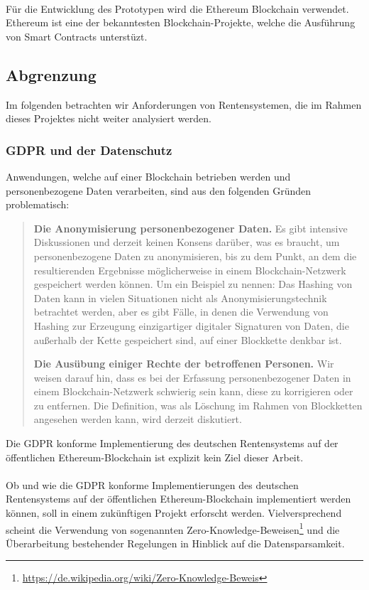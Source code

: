 \paragraph*{}
Für die Entwicklung des Prototypen wird die Ethereum Blockchain verwendet. Ethereum ist eine der bekanntesten Blockchain-Projekte, welche die Ausführung von Smart Contracts unterstüzt.

\subsection{Abgrenzung}
Im folgenden betrachten wir Anforderungen von Rentensystemen, die im Rahmen dieses Projektes nicht weiter analysiert werden.

\subsubsection{GDPR und der Datenschutz}
Anwendungen, welche auf einer Blockchain betrieben werden und personenbezogene Daten verarbeiten, sind aus den folgenden Gründen problematisch:

\begin{quote}
\textbf{Die Anonymisierung personenbezogener Daten.} Es gibt intensive Diskussionen und derzeit keinen Konsens darüber, was es braucht, um personenbezogene Daten zu anonymisieren, bis zu dem Punkt, an dem die resultierenden Ergebnisse möglicherweise in einem Blockchain-Netzwerk gespeichert werden können. Um ein Beispiel zu nennen: Das Hashing von Daten kann in vielen Situationen nicht als Anonymisierungstechnik betrachtet werden, aber es gibt Fälle, in denen die Verwendung von Hashing zur Erzeugung einzigartiger digitaler Signaturen von Daten, die außerhalb der Kette gespeichert sind, auf einer Blockkette denkbar ist.

\textbf{Die Ausübung einiger Rechte der betroffenen Personen.} Wir weisen darauf hin, dass es bei der Erfassung personenbezogener Daten in einem Blockchain-Netzwerk schwierig sein kann, diese zu korrigieren oder zu entfernen. Die Definition, was als Löschung im Rahmen von Blockketten angesehen werden kann, wird derzeit diskutiert.\cite{gdpr}
\end{quote}

Die GDPR konforme Implementierung des deutschen Rentensystems auf der öffentlichen Ethereum-Blockchain ist explizit kein Ziel dieser Arbeit.

\paragraph*{}
Ob und wie die GDPR konforme Implementierungen des deutschen Rentensystems auf der öffentlichen Ethereum-Blockchain implementiert werden können, soll in einem zukünftigen Projekt erforscht werden. Vielversprechend scheint die Verwendung von sogenannten Zero-Knowledge-Beweisen\footnote{\url{https://de.wikipedia.org/wiki/Zero-Knowledge-Beweis}} und die Überarbeitung bestehender Regelungen in Hinblick auf die Datensparsamkeit.

